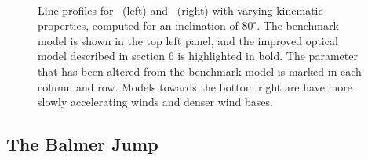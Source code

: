 \documentclass[preprint, a4paper, 11pt]{aastex}
\begin{document}
\begin{figure} %
\mbox{
\quad
{}   
}
\caption{
Line profiles for \ha\ (left) and \hb\ (right) with varying kinematic 
properties, computed for an inclination of $80^\circ$.
The benchmark model is shown in the top left panel, and the improved optical
model described in section 6 is highlighted in bold. 
The parameter that has been altered from the benchmark model 
is marked in each column and row. 
Models towards the bottom right
are have more slowly accelerating winds and denser wind bases. }
\label{halpha}
\end{figure} %



\subsection{The Balmer Jump}

\label{balmerjump}
\end{document}

